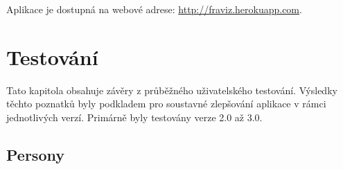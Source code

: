 \documentclass[thesis=B, czech]{FITthesis}[2019/03/06]
\begin{document}
Aplikace je dostupná na webové adrese: \url{http://fraviz.herokuapp.com}.










\chapter{Testování}

Tato kapitola obsahuje závěry z průběžného uživatelského testování. Výsledky těchto poznatků byly podkladem pro soustavné zlepšování aplikace v rámci jednotlivých verzí. Primárně byly testovány verze 2.0 až 3.0. 

\section{Persony}
\end{document}
